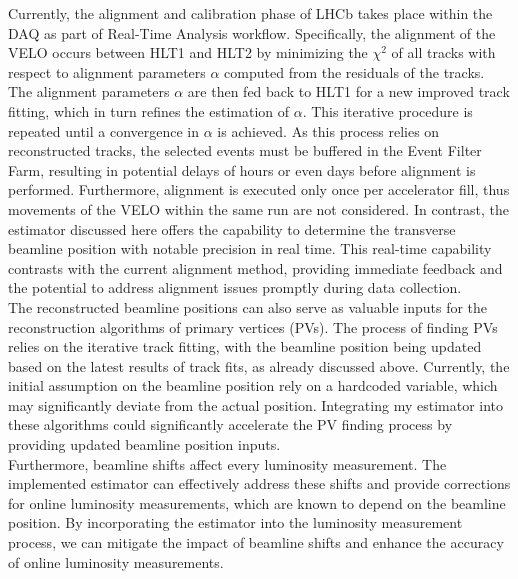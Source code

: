 Currently, the alignment and calibration phase of LHCb takes place within the DAQ as part of Real-Time Analysis workflow. Specifically, the alignment of the VELO occurs between HLT1 and HLT2 by minimizing the $\chi^2$ of all tracks with respect to alignment parameters $\alpha$ computed from the residuals of the tracks. The alignment parameters $\alpha$ are then fed back to HLT1 for a new improved track fitting, which in turn refines the estimation of $\alpha$. This iterative procedure is repeated until a convergence in $\alpha$ is achieved. As this process relies on reconstructed tracks, the selected events must be buffered in the Event Filter Farm, resulting in potential delays of hours or even days before alignment is performed. Furthermore, alignment is executed only once per accelerator fill, thus movements of the VELO within the same run are not considered. In contrast, the estimator discussed here offers the capability to determine the transverse beamline position with notable precision in real time. This real-time capability contrasts with the current alignment method, providing immediate feedback and the potential to address alignment issues promptly during data collection.\\

The reconstructed beamline positions can also serve as valuable inputs for the reconstruction algorithms of primary vertices (PVs). The process of finding PVs relies on the iterative track fitting, with the beamline position being updated based on the latest results of track fits, as already discussed above. Currently, the initial assumption on the beamline position rely on a hardcoded variable, which may significantly deviate from the actual position. Integrating my estimator into these algorithms could significantly accelerate the PV finding process by providing updated beamline position inputs.\\

Furthermore, beamline shifts affect every luminosity measurement. The implemented estimator can effectively address these shifts and provide corrections for online luminosity measurements, which are known to depend on the beamline position. By incorporating the estimator into the luminosity measurement process, we can mitigate the impact of beamline shifts and enhance the accuracy of online luminosity measurements.\\

